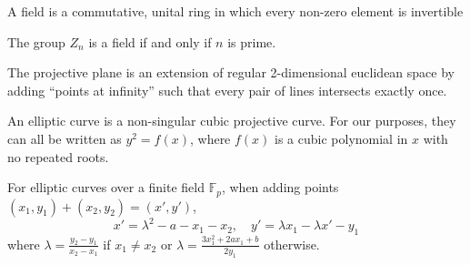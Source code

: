 \begin{definition}
	A field is a commutative, unital ring in which every non-zero element is invertible
\end{definition}
The group $Z_n$ is a field if and only if $n$ is prime.
\begin{definition}
	The projective plane is an extension of regular 2-dimensional euclidean space by adding ``points at infinity'' such that every pair of lines intersects exactly once.
\end{definition}
\begin{definition}
	An elliptic curve is a non-singular cubic projective curve. For our purposes, they can all be written as $y^2 = f(x)$, where $f(x)$ is a cubic polynomial in $x$ with no repeated roots.
\end{definition}
For elliptic curves over a finite field $\mathbb{F}_p$, when adding points $(x_1,y_1) + (x_2,y_2) = (x',y')$,
$$x'=\lambda^2 - a - x_1 - x_2,\quad y' = \lambda x_1 -\lambda x' - y_1 $$
where $\lambda = \frac{y_2-y_1}{x_2-x_1}$ if $x_1\neq x_2$ or $\lambda=\frac{3x_1^2 + 2ax_1 + b}{2y_1}$ otherwise.
